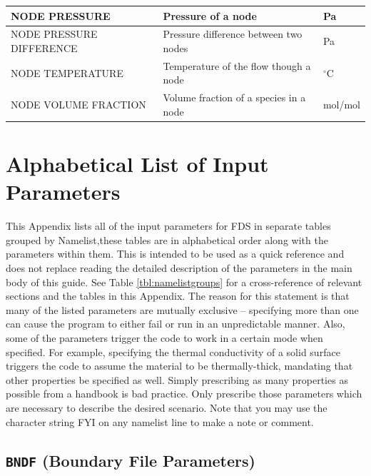 \documentclass[11pt]{book}
\begin{document}
\begin{longtable}{|l|l|l|@{\extracolsep{\fill}}}
{\ct NODE PRESSURE}                             & Pressure of a node                        &       Pa              \\ \hline
{\ct NODE PRESSURE DIFFERENCE}                  & Pressure difference between two nodes     &       Pa              \\ \hline
{\ct NODE TEMPERATURE}                          & Temperature of the flow though a node     & $^\circ$C             \\ \hline
{\ct NODE VOLUME FRACTION}                      & Volume fraction of a species in a node    &  mol/mol              \\ \hline
\end{longtable}



\chapter{Alphabetical List of Input Parameters}

This Appendix lists all of the input parameters for FDS in separate tables grouped by Namelist,these tables are in alphabetical order along with the parameters within them. This is intended to be used as a quick reference and does not replace reading the detailed description of the parameters in the main body of this guide. See Table \ref{tbl:namelistgroups} for a cross-reference of relevant sections and the tables in this Appendix. The reason for this statement is that many of the listed parameters are mutually exclusive -- specifying more than one can cause the program to either fail or run in an unpredictable manner. Also, some of the parameters trigger the code to work in a certain mode when specified. For example, specifying the thermal conductivity of a solid surface triggers the code to assume the material to be thermally-thick, mandating that other
properties be specified as well. Simply prescribing as many properties as possible from a handbook is bad practice. Only prescribe those parameters which are necessary to describe the desired scenario. Note that you may use the character string {\ct FYI} on any namelist line to make a note or comment.


\clearpage


\section{\texorpdfstring{{\tt BNDF}}{BNDF} (Boundary File Parameters)}
\end{document}
